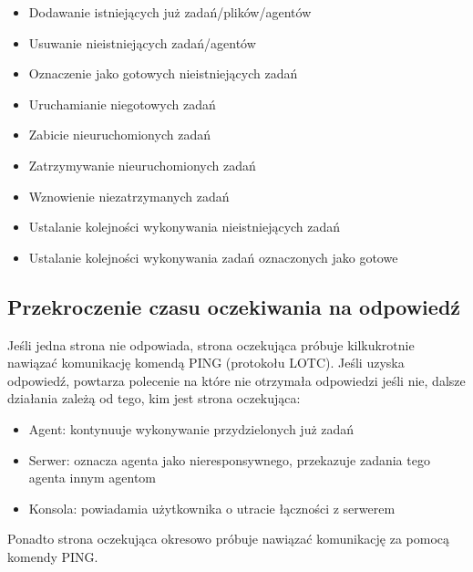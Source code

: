 \documentclass[10pt,a4paper]{article}
\begin{document}
            \begin{itemize}
	            \item Dodawanie istniejących już zadań/plików/agentów
	            \item Usuwanie nieistniejących zadań/agentów
	            \item Oznaczenie jako gotowych nieistniejących zadań
	            \item Uruchamianie niegotowych zadań
	            \item Zabicie nieuruchomionych zadań
	            \item Zatrzymywanie nieuruchomionych zadań
	            \item Wznowienie niezatrzymanych zadań
	            \item Ustalanie kolejności wykonywania nieistniejących zadań
	            \item Ustalanie kolejności wykonywania zadań oznaczonych jako gotowe
            \end{itemize}
            
		\subsection{Przekroczenie czasu oczekiwania na odpowiedź}
            Jeśli jedna strona nie odpowiada, strona oczekująca próbuje kilkukrotnie nawiązać komunikację komendą PING (protokołu LOTC). Jeśli uzyska odpowiedź, powtarza polecenie na które nie otrzymała odpowiedzi jeśli nie, dalsze działania zależą od tego, kim jest strona oczekująca:
            \begin{itemize}
	            \item Agent: kontynuuje wykonywanie przydzielonych już zadań
	            \item Serwer: oznacza agenta jako nieresponsywnego, przekazuje zadania tego agenta innym agentom
	            \item Konsola: powiadamia użytkownika o utracie łączności z serwerem
            \end{itemize}
            Ponadto strona oczekująca okresowo próbuje nawiązać komunikację za pomocą komendy PING.
            
\end{document}
